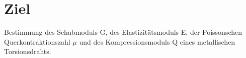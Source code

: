 \section{Ziel}
\label{sec:ziel}

Bestimmung des Schubmoduls G, des Elastizitätsmoduls E, der Poissonschen Querkontraktionszahl \(\mu\) und des Kompressionsmoduls Q eines metallischen Torsionsdrahts.